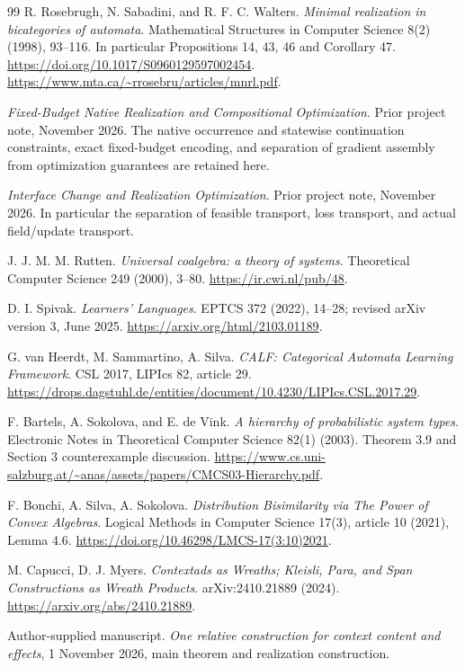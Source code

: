 \documentclass[11pt]{article}
\theoremstyle{definition}
\theoremstyle{remark}\newtheorem{remark}[theorem]{Remark}
\begin{document}
\begin{thebibliography}{99}
 R. Rosebrugh, N. Sabadini, and R. F. C. Walters.
\emph{Minimal realization in bicategories of automata}.
Mathematical Structures in Computer Science 8(2) (1998), 93--116.
In particular Propositions 14, 43, 46 and Corollary 47.
\url{https://doi.org/10.1017/S0960129597002454}.
\url{https://www.mta.ca/~rrosebru/articles/mnrl.pdf}.

\emph{Fixed-Budget Native Realization and Compositional Optimization}.
Prior project note, November 2026. The native occurrence and statewise
continuation constraints, exact fixed-budget encoding, and separation of
gradient assembly from optimization guarantees are retained here.

\emph{Interface Change and Realization Optimization}.
Prior project note, November 2026. In particular the separation of
feasible transport, loss transport, and actual field/update transport.

 J. J. M. M. Rutten.
\emph{Universal coalgebra: a theory of systems}.
Theoretical Computer Science 249 (2000), 3--80.
\url{https://ir.cwi.nl/pub/48}.

 D. I. Spivak. \emph{Learners' Languages}.
EPTCS 372 (2022), 14--28; revised arXiv version 3, June 2025.
\url{https://arxiv.org/html/2103.01189}.

 G. van Heerdt, M. Sammartino, A. Silva.
\emph{CALF: Categorical Automata Learning Framework}.
CSL 2017, LIPIcs 82, article 29.
\url{https://drops.dagstuhl.de/entities/document/10.4230/LIPIcs.CSL.2017.29}.

 F. Bartels, A. Sokolova, and E. de Vink.
\emph{A hierarchy of probabilistic system types}.
Electronic Notes in Theoretical Computer Science 82(1) (2003).
Theorem 3.9 and Section 3 counterexample discussion.
\url{https://www.cs.uni-salzburg.at/~anas/assets/papers/CMCS03-Hierarchy.pdf}.

 F. Bonchi, A. Silva, A. Sokolova.
\emph{Distribution Bisimilarity via The Power of Convex Algebras}.
Logical Methods in Computer Science 17(3), article 10 (2021), Lemma 4.6.
\url{https://doi.org/10.46298/LMCS-17(3:10)2021}.

 M. Capucci, D. J. Myers.
\emph{Contextads as Wreaths; Kleisli, Para, and Span Constructions as Wreath Products}.
arXiv:2410.21889 (2024).
\url{https://arxiv.org/abs/2410.21889}.

 Author-supplied manuscript.
\emph{One relative construction for context content and effects},
1 November 2026, main theorem and realization construction.


\end{thebibliography}
\end{document}
